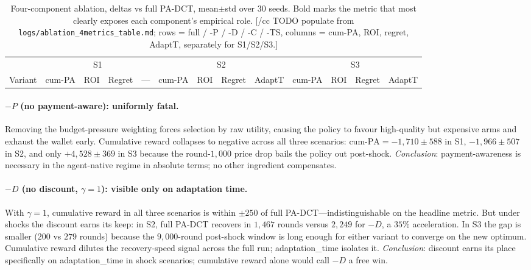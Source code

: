 \begin{table}[t]
\centering
\caption{Four-component ablation, deltas vs full PA-DCT, mean$\pm$std over $30$ seeds. Bold marks the metric that most clearly exposes each component's empirical role. [/cc TODO populate from \texttt{logs/ablation\_4metrics\_table.md}; rows = full / -P / -D / -C / -TS, columns = cum-PA, ROI, regret, AdaptT, separately for S1/S2/S3.]}
\label{tab:ablations}
\begin{tabular}{l|cccc|cccc|cccc}
\toprule
& \multicolumn{4}{c|}{S1} & \multicolumn{4}{c|}{S2} & \multicolumn{4}{c}{S3} \\
Variant & cum-PA & ROI & Regret & --- & cum-PA & ROI & Regret & AdaptT & cum-PA & ROI & Regret & AdaptT \\
\midrule
\bottomrule
\end{tabular}
\end{table}

\paragraph{$-P$ (no payment-aware): uniformly fatal.}
Removing the budget-pressure weighting forces selection by raw utility, causing the policy to favour high-quality but expensive arms and exhaust the wallet early. Cumulative reward collapses to negative across all three scenarios: $\mathrm{cum\text{-}PA} = -1{,}710 \pm 588$ in S1, $-1{,}966 \pm 507$ in S2, and only $+4{,}528 \pm 369$ in S3 because the round-$1{,}000$ price drop bails the policy out post-shock. \emph{Conclusion}: payment-awareness is necessary in the agent-native regime in absolute terms; no other ingredient compensates.

\paragraph{$-D$ (no discount, $\gamma=1$): visible only on adaptation time.}
With $\gamma = 1$, cumulative reward in all three scenarios is within $\pm 250$ of full PA-DCT—indistinguishable on the headline metric. But under shocks the discount earns its keep: in S2, full PA-DCT recovers in $1{,}467$ rounds versus $2{,}249$ for $-D$, a $35\%$ acceleration. In S3 the gap is smaller ($200$ vs $279$ rounds) because the $9{,}000$-round post-shock window is long enough for either variant to converge on the new optimum. Cumulative reward dilutes the recovery-speed signal across the full run; adaptation\_time isolates it. \emph{Conclusion}: discount earns its place specifically on adaptation\_time in shock scenarios; cumulative reward alone would call $-D$ a free win.

